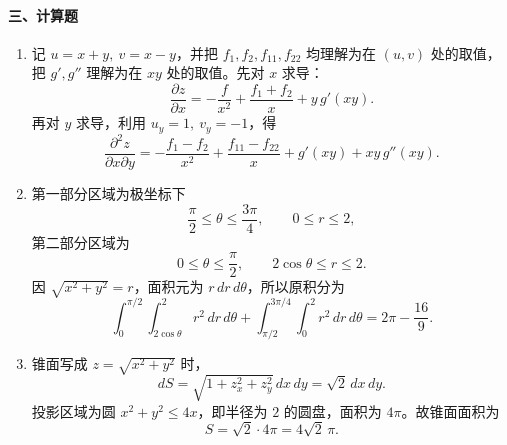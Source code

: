 \paragraph*{三、计算题}
\begin{enumerate}
  \item 记 $u=x+y,\ v=x-y$，并把 $f_1,f_2,f_{11},f_{22}$ 均理解为在 $(u,v)$ 处的取值，把 $g',g''$
  理解为在 $xy$ 处的取值。先对 $x$ 求导：
  \[
    \frac{\partial z}{\partial x}
    =-\frac{f}{x^2}+\frac{f_1+f_2}{x}+y\,g'(xy).
  \]
  再对 $y$ 求导，利用 $u_y=1,\ v_y=-1$，得
  \[
    \frac{\partial^2z}{\partial x\partial y}
    =-\frac{f_1-f_2}{x^2}+\frac{f_{11}-f_{22}}{x}+g'(xy)+xy\,g''(xy).
  \]

  \item 第一部分区域为极坐标下
  \[
    \frac{\pi}{2}\le\theta\le\frac{3\pi}{4},\qquad 0\le r\le2,
  \]
  第二部分区域为
  \[
    0\le\theta\le\frac{\pi}{2},\qquad 2\cos\theta\le r\le2.
  \]
  因 $\sqrt{x^2+y^2}=r$，面积元为 $r\,dr\,d\theta$，所以原积分为
  \[
    \int_0^{\pi/2}\int_{2\cos\theta}^{2}r^2\,dr\,d\theta
    +\int_{\pi/2}^{3\pi/4}\int_0^2r^2\,dr\,d\theta
    =2\pi-\frac{16}{9}.
  \]

  \item 锥面写成 $z=\sqrt{x^2+y^2}$ 时，
  \[
    dS=\sqrt{1+z_x^2+z_y^2}\,dx\,dy=\sqrt2\,dx\,dy.
  \]
  投影区域为圆 $x^2+y^2\le4x$，即半径为 $2$ 的圆盘，面积为 $4\pi$。故锥面面积为
  \[
    S=\sqrt2\cdot4\pi=4\sqrt2\,\pi.
  \]
\end{enumerate}

